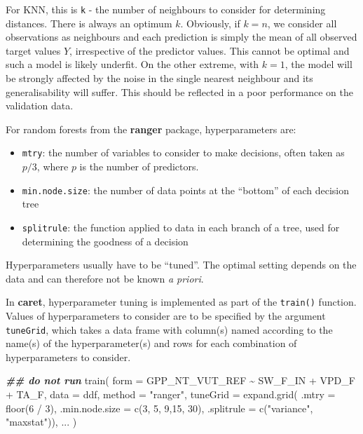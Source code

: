 \documentclass[
]{book}
\newenvironment{Shaded}{\begin{snugshade}}{\end{snugshade}}
\newcommand{\AttributeTok}[1]{\textcolor[rgb]{0.77,0.63,0.00}{#1}}
\newcommand{\DecValTok}[1]{\textcolor[rgb]{0.00,0.00,0.81}{#1}}
\newcommand{\DocumentationTok}[1]{\textcolor[rgb]{0.56,0.35,0.01}{\textbf{\textit{#1}}}}
\newcommand{\FunctionTok}[1]{\textcolor[rgb]{0.00,0.00,0.00}{#1}}
\newcommand{\NormalTok}[1]{#1}
\newcommand{\SpecialCharTok}[1]{\textcolor[rgb]{0.00,0.00,0.00}{#1}}
\newcommand{\StringTok}[1]{\textcolor[rgb]{0.31,0.60,0.02}{#1}}
\providecommand{\tightlist}{%
  \setlength{\itemsep}{0pt}\setlength{\parskip}{0pt}}
\begin{document}
For KNN, this is \texttt{k} - the number of neighbours to consider for determining distances. There is always an optimum \(k\). Obviously, if \(k = n\), we consider all observations as neighbours and each prediction is simply the mean of all observed target values \(Y\), irrespective of the predictor values. This cannot be optimal and such a model is likely underfit. On the other extreme, with \(k = 1\), the model will be strongly affected by the noise in the single nearest neighbour and its generalisability will suffer. This should be reflected in a poor performance on the validation data.

For random forests from the \textbf{ranger} package, hyperparameters are:

\begin{itemize}
\tightlist
\item
  \texttt{mtry}: the number of variables to consider to make decisions, often taken as \(p/3\), where \(p\) is the number of predictors.
\item
  \texttt{min.node.size}: the number of data points at the ``bottom'' of each decision tree
\item
  \texttt{splitrule}: the function applied to data in each branch of a tree, used for determining the goodness of a decision
\end{itemize}

Hyperparameters usually have to be ``tuned''. The optimal setting depends on the data and can therefore not be known \emph{a priori}.

In \textbf{caret}, hyperparameter tuning is implemented as part of the \texttt{train()} function. Values of hyperparameters to consider are to be specified by the argument \texttt{tuneGrid}, which takes a data frame with column(s) named according to the name(s) of the hyperparameter(s) and rows for each combination of hyperparameters to consider.

\begin{Shaded}
\begin{Highlighting}[]
\DocumentationTok{\#\# do not run}
\FunctionTok{train}\NormalTok{(}
  \AttributeTok{form =}\NormalTok{ GPP\_NT\_VUT\_REF }\SpecialCharTok{\textasciitilde{}}\NormalTok{ SW\_F\_IN }\SpecialCharTok{+}\NormalTok{ VPD\_F }\SpecialCharTok{+}\NormalTok{ TA\_F, }
  \AttributeTok{data =}\NormalTok{ ddf, }
  \AttributeTok{method =} \StringTok{"ranger"}\NormalTok{,}
  \AttributeTok{tuneGrid =} \FunctionTok{expand.grid}\NormalTok{( }\AttributeTok{.mtry =} \FunctionTok{floor}\NormalTok{(}\DecValTok{6} \SpecialCharTok{/} \DecValTok{3}\NormalTok{),}
                          \AttributeTok{.min.node.size =} \FunctionTok{c}\NormalTok{(}\DecValTok{3}\NormalTok{, }\DecValTok{5}\NormalTok{, }\DecValTok{9}\NormalTok{,}\DecValTok{15}\NormalTok{, }\DecValTok{30}\NormalTok{),}
                          \AttributeTok{.splitrule =} \FunctionTok{c}\NormalTok{(}\StringTok{"variance"}\NormalTok{, }\StringTok{"maxstat"}\NormalTok{)),}
\NormalTok{  ...}
\NormalTok{)}
\end{Highlighting}
\end{Shaded}
\end{document}
